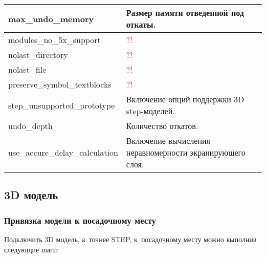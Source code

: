 \begin{tabularx}{\linewidth}{| m{6.5cm} | X |}
	max\_undo\_memory 		& Размер памяти отведенной под откаты.	\\ \hline
	modules\_no\_5x\_support& \textcolor{red}{?!}					\\ \hline
	nolast\_directory 		& \textcolor{red}{?!}					\\ \hline
	nolast\_file 			& \textcolor{red}{?!}					\\ \hline
	preserve\_symbol\_textblocks & \textcolor{red}{?!}				\\ \hline	
	step\_unsupported\_prototype & Включение опций поддержки 3D step-моделей. \\ \hline
	undo\_depth 			& Количество откатов.					\\ \hline
	use\_accure\_delay\_calculation & Включение вычисления неравномерности экранирующего слоя. \\ \hline
		
	
	
\end{tabularx}

\subsection{3D модель} \label{ssec:3d_model}

\subsubsection{Привязка модели к посадочному месту} \label{sssec:step_package_mapping}

Подключить 3D модель, а~точнее STEP, к~посадочному месту можно выполнив следующие шаги:

